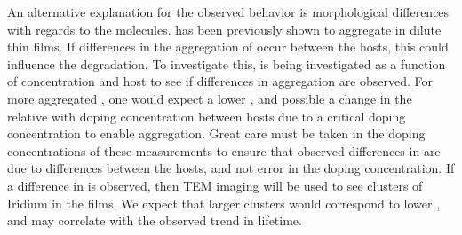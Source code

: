 \documentclass[../thesis.tex]{subfiles}
\begin{document}
An alternative explanation for the observed behavior is morphological differences with regards to the \irppy molecules.
\irppy has been previously shown to aggregate in dilute thin films.\supercite{Reineke2009}
If differences in the aggregation of \irppy occur between the hosts, this could influence the degradation.
To investigate this, \pl is being investigated as a function of concentration and host to see if differences in aggregation are observed.
For more aggregated \irppy, one would expect a lower \pl, and possible a change in the relative \pl with doping concentration between hosts due to a critical doping concentration to enable aggregation.
Great care must be taken in the doping concentrations of these measurements to ensure that observed differences in \pl are due to differences between the hosts, and not error in the doping concentration.
If a difference in \pl is observed, then TEM imaging will be used to see clusters of Iridium in the films.
We expect that larger clusters would correspond to lower \pl, and may correlate with the observed trend in lifetime.

\end{document}
